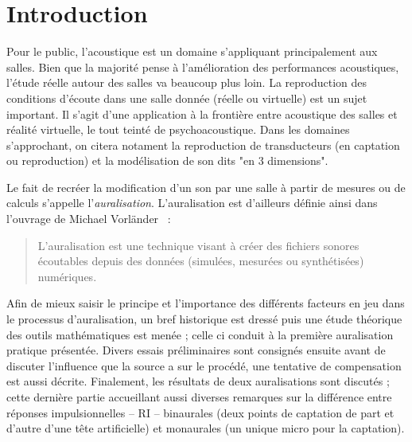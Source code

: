 \chapter*{Introduction}
Pour le public, l'acoustique est un domaine s'appliquant principalement aux salles.
Bien que la majorité pense à l'amélioration des performances acoustiques, l'étude réelle autour des salles va
beaucoup plus loin.
La reproduction des conditions d'écoute dans une salle donnée (réelle ou virtuelle) est un sujet important. Il s'agit d'une
application à la frontière entre acoustique des salles et réalité virtuelle, le tout teinté de psychoacoustique. Dans les
domaines s'approchant, on citera notament la reproduction de transducteurs (en captation ou reproduction) et la modélisation de son dits "en 3 dimensions".

\medskip

Le fait de recréer la modification d'un son par une salle à partir de mesures ou de calculs s'appelle
l'\emph{auralisation}. L'auralisation est d'ailleurs définie ainsi dans l'ouvrage de Michael
Vorländer~\cite{Vor08} :

\begin{quote}
L'auralisation est une technique visant à créer des fichiers sonores écoutables depuis des données (simulées, mesurées
ou synthétisées) numériques.

\end{quote}

\medskip

Afin de mieux saisir le principe et l'importance des différents facteurs en jeu dans le processus d'auralisation, un bref historique est dressé puis une étude théorique des outils mathématiques est menée ; celle ci conduit à la première auralisation pratique présentée. Divers essais préliminaires sont consignés ensuite avant de discuter l'influence que la source a sur le procédé, une tentative de compensation est aussi décrite. Finalement, les résultats de deux auralisations sont discutés ; cette dernière partie accueillant aussi diverses remarques sur la différence entre réponses impulsionnelles -- RI -- binaurales (deux points de captation de part et
d'autre d'une tête artificielle) et monaurales (un unique micro pour la captation).
